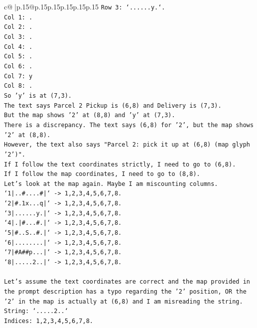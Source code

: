 \documentclass{article}
\begin{document}
{\begin{supertabular}{c@{$\;$}|p{.15\linewidth}@{}p{.15\linewidth}p{.15\linewidth}p{.15\linewidth}p{.15\linewidth}p{.15\linewidth}}
{{{\texttt{Row 3: `......y.`.} \\
\texttt{Col 1: .} \\
\texttt{Col 2: .} \\
\texttt{Col 3: .} \\
\texttt{Col 4: .} \\
\texttt{Col 5: .} \\
\texttt{Col 6: .} \\
\texttt{Col 7: y} \\
\texttt{Col 8: .} \\
\texttt{So 'y' is at (7,3).} \\
\texttt{The text says Parcel 2 Pickup is (6,8) and Delivery is (7,3).} \\
\texttt{But the map shows '2' at (8,8) and 'y' at (7,3).} \\
\texttt{There is a discrepancy. The text says (6,8) for '2', but the map shows '2' at (8,8).} \\
\texttt{However, the text also says "Parcel 2: pick it up at (6,8) (map glyph '2')".} \\
\texttt{If I follow the text coordinates strictly, I need to go to (6,8).} \\
\texttt{If I follow the map coordinates, I need to go to (8,8).} \\
\texttt{Let's look at the map again. Maybe I am miscounting columns.} \\
\texttt{`1|..\#....\#|` {-}> 1,2,3,4,5,6,7,8.} \\
\texttt{`2|\#.1x...q|` {-}> 1,2,3,4,5,6,7,8.} \\
\texttt{`3|......y.|` {-}> 1,2,3,4,5,6,7,8.} \\
\texttt{`4|.|\#...\#.|` {-}> 1,2,3,4,5,6,7,8.} \\
\texttt{`5|\#..S..\#.|` {-}> 1,2,3,4,5,6,7,8.} \\
\texttt{`6|........|` {-}> 1,2,3,4,5,6,7,8.} \\
\texttt{`7|\#A\#\#p...|` {-}> 1,2,3,4,5,6,7,8.} \\
\texttt{`8|.....2..|` {-}> 1,2,3,4,5,6,7,8.} \\
\\ 
\texttt{Let's assume the text coordinates are correct and the map provided in the prompt description has a typo regarding the '2' position, OR the '2' in the map is actually at (6,8) and I am misreading the string.} \\
\texttt{String: `.....2..`} \\
\texttt{Indices: 1,2,3,4,5,6,7,8.} \\
}}}
\end{supertabular}}
\end{document}
